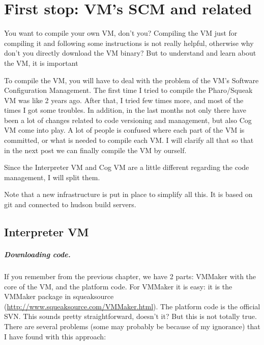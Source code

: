 \documentclass[a4paper,10pt,twoside]{book}
\begin{document}
\fi
\sloppy


\chapter{First stop: VM's SCM and related}

You want to compile your own VM, don't you? Compiling the VM just for compiling it and following some instructions is not really helpful, otherwise why don't you directly download the VM binary?  But to understand and learn about the VM, it is important 

To compile the VM, you will have to deal with the problem of the VM's Software Configuration Management. The first time I tried to compile the Pharo/Squeak VM was like 2 years ago. After that, I tried few times more, and most of the times I got some troubles. In addition, in the last months not only there have been a lot of changes related to code versioning and management, but also Cog VM come into play. A lot of people is confused where each part of the VM is committed, or what is needed to compile each VM. I will clarify all that so that in the next post we can finally compile the VM by ourself.

Since the Interpreter VM and Cog VM are a little different regarding the code management, I will split them.

Note that a new infrastructure is put in place to simplify all this. It is based on git and connected to hudson build servers. 

\section{Interpreter VM}

\paragraph{Downloading code.}
If you remember from the previous chapter, we have 2 parts: VMMaker with the core of the VM, and the platform code. For VMMaker it is easy: it is the VMMaker package in squeaksource (\url{http://www.squeaksource.com/VMMaker.html}). The platform code is the official SVN. This sounds pretty straightforward, doesn't it?  But this is not totally true. There are several problems (some may probably be because of my ignorance) that I have found with this approach:
\end{document}
